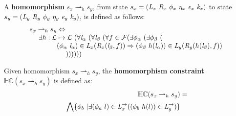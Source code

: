 \begin{definition}
\label{def:homomorphism}
A \textbf{homomorphism} $s_x \rightharpoonup_{h} s_y$, from state $s_x = ( \cfgnt{L}_x\ \cfgnt{R}_x\ \phi_x\ \eta_x\ \cfgnt{e}_x\ \cfgnt{k}_x )$ to state $s_y = ( \cfgnt{L}_y\ \cfgnt{R}_y\ \phi_y\ \eta_y\ \cfgnt{e}_y\ \cfgnt{k}_y )$, is defined as follows: 
$$
\begin{array}{l}
 s_x \rightharpoonup_{h} s_y \Leftrightarrow \\
\ \ \ \ \exists h: \mathcal{L} \mapsto \mathcal{L}\ (\forall \cfgnt{l}_\alpha\ (\forall \cfgnt{l}_\beta\ (\forall f \in \mathcal{F}( \exists \phi_\alpha\ (\exists \phi_\beta\ ( \\ 
\ \ \ \ \ \ \ \ \ \ \ \ (\phi_\alpha\ \cfgnt{l}_\alpha) \in \cfgnt{L}_x(\cfgnt{R}_x (\cfgnt{l}_\beta,f )) \Rightarrow (\phi_\beta\ h(\cfgnt{l}_\alpha))\in \cfgnt{L}_y(\cfgnt{R}_y (h(\cfgnt{l}_\beta),f ))\ \\
\ \ \ \ \ \ \ \ \ \ \ \ \ \ \ \  )) ) ) ) )
\end{array}
$$
\begin{comment}
$$
\begin{array}{l}
s_x \rightharpoonup_{h} s_y \Leftrightarrow \\
\ \ \ \ \exists h: \mathcal{L} \mapsto \mathcal{L}\ (\forall \cfgnt{l}_\beta\ (\forall f \in \mathit{fields}(\mathrm{type}(\cfgnt{l}_\beta))\ ( \\
\ \ \ \ \ \ \ \ \ \ \ \ \forall (\phi_\alpha\ \cfgnt{l}_\alpha) \in \cfgnt{L}_x(\cfgnt{R}_x (\cfgnt{l}_\beta,f ))\ ( \\
\ \ \ \ \ \ \ \ \ \ \ \ \ \ \ \ \exists \phi_\beta\ ((\phi_\beta\ h(\cfgnt{l}_\alpha))\in \cfgnt{L}_y(\cfgnt{R}_y (h(\cfgnt{l}_\beta),f )))))))\\
\end{array}
$$
\end{comment}
\end{definition}

\begin{definition}
\label{def:hc}
Given homomorphism $s_x \rightharpoonup_{h} s_y$, the \textbf{homomorphism constraint} $\mathbb{HC}(s_x \rightharpoonup_{h} s_y)$ is defined as:
\begin{align*}
\mathbb{HC}(s_x \rightharpoonup_{h} s_y) &= \\
 \bigwedge \{ \phi_b\ | \exists (\phi_a\ l) \in \emph{L}_x^\rightarrow ( (\phi_b\ h(l)) \in \emph{L}_y^\rightarrow)\} 
\end{align*}
\end{definition}

